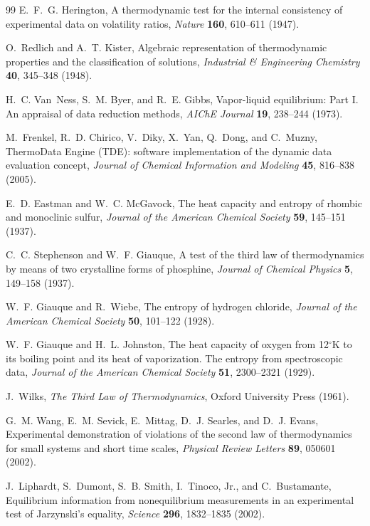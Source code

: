 \begin{thebibliography}{99}
E.~F.~G. Herington,
A thermodynamic test for the internal consistency of experimental data on volatility ratios,
\emph{Nature} \textbf{160}, 610--611 (1947).

O.~Redlich and A.~T. Kister,
Algebraic representation of thermodynamic properties and the classification of solutions,
\emph{Industrial \& Engineering Chemistry} \textbf{40}, 345--348 (1948).

H.~C. Van~Ness, S.~M. Byer, and R.~E. Gibbs,
Vapor-liquid equilibrium: Part I. An appraisal of data reduction methods,
\emph{AIChE Journal} \textbf{19}, 238--244 (1973).

M.~Frenkel, R.~D. Chirico, V.~Diky, X.~Yan, Q.~Dong, and C.~Muzny,
ThermoData Engine (TDE): software implementation of the dynamic data evaluation concept,
\emph{Journal of Chemical Information and Modeling} \textbf{45}, 816--838 (2005).

E.~D. Eastman and W.~C. McGavock,
The heat capacity and entropy of rhombic and monoclinic sulfur,
\emph{Journal of the American Chemical Society} \textbf{59}, 145--151 (1937).

C.~C. Stephenson and W.~F. Giauque,
A test of the third law of thermodynamics by means of two crystalline forms of phosphine,
\emph{Journal of Chemical Physics} \textbf{5}, 149--158 (1937).

W.~F. Giauque and R.~Wiebe,
The entropy of hydrogen chloride,
\emph{Journal of the American Chemical Society} \textbf{50}, 101--122 (1928).

W.~F. Giauque and H.~L. Johnston,
The heat capacity of oxygen from 12$^\circ$K to its boiling point and its heat of vaporization. The entropy from spectroscopic data,
\emph{Journal of the American Chemical Society} \textbf{51}, 2300--2321 (1929).

J.~Wilks,
\emph{The Third Law of Thermodynamics},
Oxford University Press (1961).

G.~M. Wang, E.~M. Sevick, E.~Mittag, D.~J. Searles, and D.~J. Evans,
Experimental demonstration of violations of the second law of thermodynamics for small systems and short time scales,
\emph{Physical Review Letters} \textbf{89}, 050601 (2002).

J.~Liphardt, S.~Dumont, S.~B. Smith, I.~Tinoco, Jr., and C.~Bustamante,
Equilibrium information from nonequilibrium measurements in an experimental test of Jarzynski's equality,
\emph{Science} \textbf{296}, 1832--1835 (2002).


\end{thebibliography}
